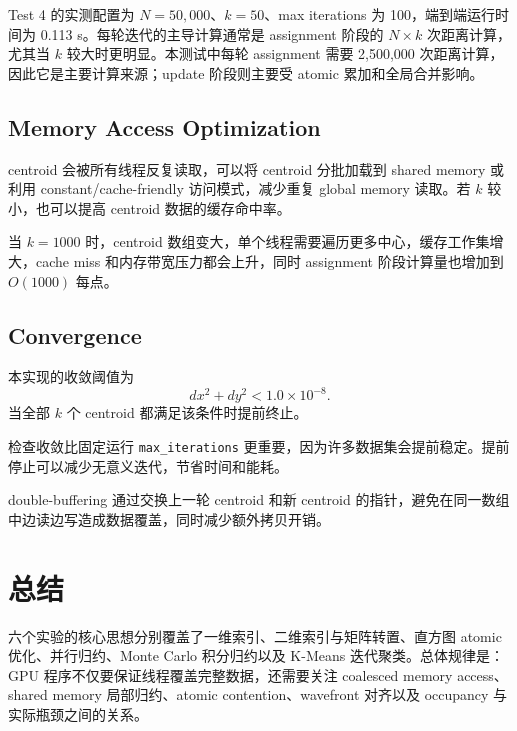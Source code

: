 \documentclass[UTF8,a4paper,12pt,fontset=none]{ctexart}
\begin{document}
Test 4 的实测配置为 $N=50,000$、$k=50$、max iterations 为 100，端到端运行时间为 0.113 s。每轮迭代的主导计算通常是 assignment 阶段的 $N\times k$ 次距离计算，尤其当 $k$ 较大时更明显。本测试中每轮 assignment 需要 2,500,000 次距离计算，因此它是主要计算来源；update 阶段则主要受 atomic 累加和全局合并影响。

\subsection{Memory Access Optimization}

centroid 会被所有线程反复读取，可以将 centroid 分批加载到 shared memory 或利用 constant/cache-friendly 访问模式，减少重复 global memory 读取。若 $k$ 较小，也可以提高 centroid 数据的缓存命中率。

当 $k=1000$ 时，centroid 数组变大，单个线程需要遍历更多中心，缓存工作集增大，cache miss 和内存带宽压力都会上升，同时 assignment 阶段计算量也增加到 $O(1000)$ 每点。

\subsection{Convergence}

本实现的收敛阈值为
\[
  dx^2+dy^2<1.0\times10^{-8}.
\]
当全部 $k$ 个 centroid 都满足该条件时提前终止。

检查收敛比固定运行 \texttt{max\_iterations} 更重要，因为许多数据集会提前稳定。提前停止可以减少无意义迭代，节省时间和能耗。

double-buffering 通过交换上一轮 centroid 和新 centroid 的指针，避免在同一数组中边读边写造成数据覆盖，同时减少额外拷贝开销。

\section{总结}

六个实验的核心思想分别覆盖了一维索引、二维索引与矩阵转置、直方图 atomic 优化、并行归约、Monte Carlo 积分归约以及 K-Means 迭代聚类。总体规律是：GPU 程序不仅要保证线程覆盖完整数据，还需要关注 coalesced memory access、shared memory 局部归约、atomic contention、wavefront 对齐以及 occupancy 与实际瓶颈之间的关系。
\end{document}
